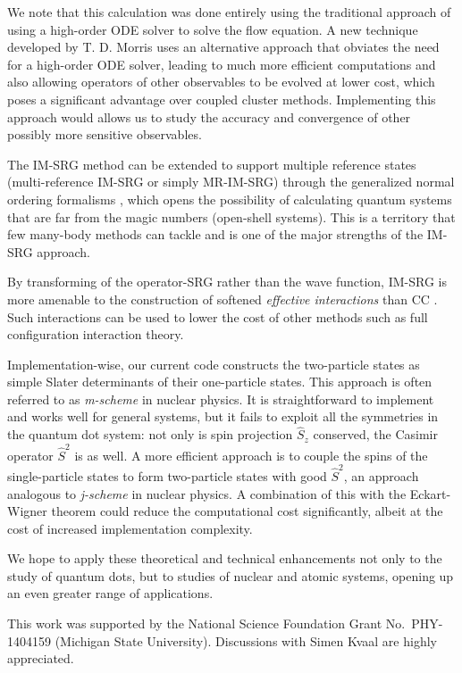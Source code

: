 We note that this calculation was done entirely using the traditional
approach of using a high-order ODE solver to solve the flow equation.
A new technique developed by T. D. Morris \cite{PhysRevC.92.034331}
uses an alternative approach that obviates the need for a high-order
ODE solver, leading to much more efficient computations and also
allowing operators of other observables to be evolved at lower cost,
which poses a significant advantage over coupled cluster methods.
Implementing this approach would allows us to study the accuracy and
convergence of other possibly more sensitive observables.

The IM-SRG method can be extended to support multiple reference states
(multi-reference IM-SRG or simply
MR-IM-SRG) \cite{PhysRevLett.110.242501,PhysRevC.90.041302} through
the generalized normal ordering
formalisms \cite{doi:10.1063/1.474405}, which opens the possibility of
calculating quantum systems that are far from the magic numbers
(open-shell systems).  This is a territory that few many-body methods
can tackle and is one of the major strengths of the IM-SRG approach.

By transforming of the operator-SRG rather than the wave function,
IM-SRG is more amenable to the construction of
softened \textit{effective interactions} than
CC \cite{Hergert2016165}.  Such interactions can be used to lower the
cost of other methods such as full configuration interaction theory.

Implementation-wise, our current code constructs the two-particle
states as simple Slater determinants of their one-particle states.
This approach is often referred to as \textit{m-scheme} in nuclear
physics.  It is straightforward to implement and works well for
general systems, but it fails to exploit all the symmetries in the
quantum dot system: not only is spin projection $\hat S_z$ conserved,
the Casimir operator $\hat S^2$ is as well.  A more efficient approach
is to couple the spins of the single-particle states to form
two-particle states with good $\hat S^2$, an approach analogous
to \textit{j-scheme} in nuclear physics.  A combination of this with
the Eckart-Wigner theorem could reduce the computational cost
significantly, albeit at the cost of increased implementation
complexity.


We hope to apply these theoretical and technical enhancements not only
to the study of quantum dots, but to studies of nuclear and atomic
systems, opening up an even greater range of applications.

\begin{acknowledgments}
  This work was supported by the National Science Foundation Grant No.\ PHY-1404159 (Michigan State University). Discussions with Simen Kvaal are highly appreciated.
\end{acknowledgments}




